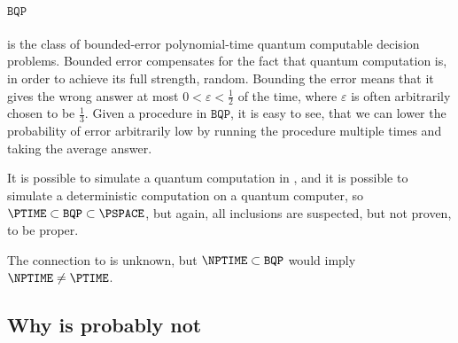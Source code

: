 \paragraph{$\mathtt{BQP}$}
is the class of bounded-error polynomial-time quantum computable decision 
problems. Bounded error compensates for the fact that quantum computation is, 
in order to achieve its full strength, random. Bounding the error means that 
it gives the wrong answer at most $0<\varepsilon<\frac{1}{2}$ of the time, where 
$\varepsilon$ is often arbitrarily chosen to be $\frac{1}{3}$. Given a 
procedure in $\mathtt{BQP}$, it is easy to see, that we can lower the 
probability of error arbitrarily low by running the procedure multiple times 
and taking the average answer.

It is possible to simulate a quantum computation in \PSPACE, and it is 
possible to simulate a deterministic computation on a quantum computer, so 
$\PTIME \subset \mathtt{BQP} \subset \PSPACE$, but again, all inclusions are 
suspected, but not proven, to be proper.

The connection to \NPTIME is unknown, but $\NPTIME\subset \mathtt{BQP}$ would 
imply $\NPTIME\neq \PTIME$.

\subsection{Why \PTIME is probably not \NPTIME}
\cite{impagliazzo1995personal}
